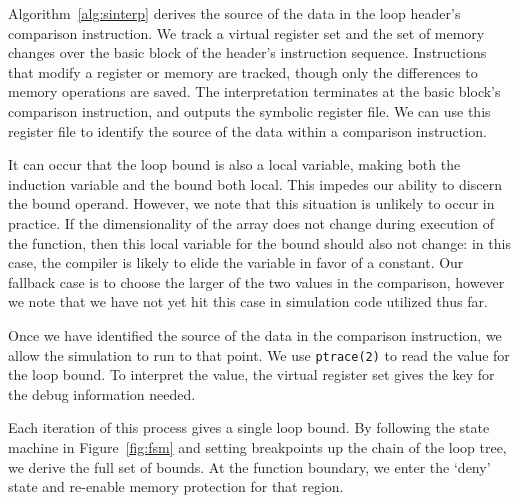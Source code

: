 Algorithm~\ref{alg:sinterp} derives the source of the data in the loop
header's comparison instruction.  We track a virtual register set
and the set of memory changes over the basic block of the header's
instruction sequence.  Instructions that modify a register or memory
are tracked, though only the differences to memory operations are
saved.  The interpretation terminates at the basic block's comparison
instruction, and outputs the symbolic register file.  We can use this
register file to identify the source of the data within a comparison
instruction.

It can occur that the loop bound is also a local variable, making
both the induction variable and the bound both local.  This impedes
our ability to discern the bound operand.  However, we note that this
situation is unlikely to occur in practice.  If the dimensionality of
the array does not change during execution of the function, then this
local variable for the bound should also not change: in this case,
the compiler is likely to elide the variable in favor of a constant.
Our fallback case is to choose the larger of the two values in the
comparison, however we note that we have not yet hit this case in
simulation code utilized thus far.

Once we have identified the source of the data in the comparison
instruction, we allow the simulation to run to that point.  We use
\texttt{ptrace(2)} to read the value for the loop bound.  To interpret
the value, the virtual register set gives the key for the debug
information needed.


Each iteration of this process gives a single loop bound.  By following
the
state machine in Figure~\ref{fig:fsm} and setting breakpoints up the
chain of the loop tree, we derive the full set of bounds.  At the
function boundary, we enter the `deny' state and re-enable memory
protection for that region.

